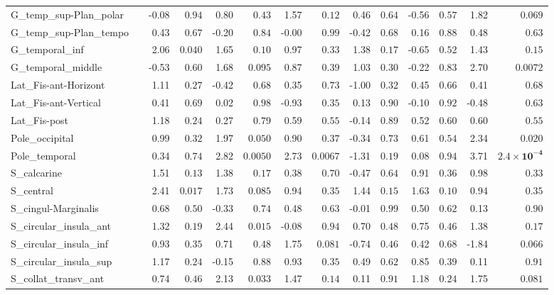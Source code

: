 {\begin{longtable}{llrrrrrrrrrrrr}
G\_temp\_sup-Plan\_polar &  & -0.08 & $0.94$ & 0.80 & $0.43$ & 1.57 & $0.12$ & 0.46 & $0.64$ & -0.56 & $0.57$ & 1.82 & $0.069$ \\
G\_temp\_sup-Plan\_tempo &  & 0.43 & $0.67$ & -0.20 & $0.84$ & -0.00 & $0.99$ & -0.42 & $0.68$ & 0.16 & $0.88$ & 0.48 & $0.63$ \\
G\_temporal\_inf &  & 2.06 & $0.040$ & 1.65 & $0.10$ & 0.97 & $0.33$ & 1.38 & $0.17$ & -0.65 & $0.52$ & 1.43 & $0.15$ \\
G\_temporal\_middle &  & -0.53 & $0.60$ & 1.68 & $0.095$ & 0.87 & $0.39$ & 1.03 & $0.30$ & -0.22 & $0.83$ & 2.70 & $0.0072$ \\
Lat\_Fis-ant-Horizont &  & 1.11 & $0.27$ & -0.42 & $0.68$ & 0.35 & $0.73$ & -1.00 & $0.32$ & 0.45 & $0.66$ & 0.41 & $0.68$ \\
Lat\_Fis-ant-Vertical &  & 0.41 & $0.69$ & 0.02 & $0.98$ & -0.93 & $0.35$ & 0.13 & $0.90$ & -0.10 & $0.92$ & -0.48 & $0.63$ \\
Lat\_Fis-post &  & 1.18 & $0.24$ & 0.27 & $0.79$ & 0.59 & $0.55$ & -0.14 & $0.89$ & 0.52 & $0.60$ & 0.60 & $0.55$ \\
Pole\_occipital &  & 0.99 & $0.32$ & 1.97 & $0.050$ & 0.90 & $0.37$ & -0.34 & $0.73$ & 0.61 & $0.54$ & 2.34 & $0.020$ \\
Pole\_temporal &  & 0.34 & $0.74$ & 2.82 & $0.0050$ & 2.73 & $0.0067$ & -1.31 & $0.19$ & 0.08 & $0.94$ & 3.71 & $\mathbf{2.4{\times}10^{-4}}$ \\
S\_calcarine &  & 1.51 & $0.13$ & 1.38 & $0.17$ & 0.38 & $0.70$ & -0.47 & $0.64$ & 0.91 & $0.36$ & 0.98 & $0.33$ \\
S\_central &  & 2.41 & $0.017$ & 1.73 & $0.085$ & 0.94 & $0.35$ & 1.44 & $0.15$ & 1.63 & $0.10$ & 0.94 & $0.35$ \\
S\_cingul-Marginalis &  & 0.68 & $0.50$ & -0.33 & $0.74$ & 0.48 & $0.63$ & -0.01 & $0.99$ & 0.50 & $0.62$ & 0.13 & $0.90$ \\
S\_circular\_insula\_ant &  & 1.32 & $0.19$ & 2.44 & $0.015$ & -0.08 & $0.94$ & 0.70 & $0.48$ & 0.75 & $0.46$ & 1.38 & $0.17$ \\
S\_circular\_insula\_inf &  & 0.93 & $0.35$ & 0.71 & $0.48$ & 1.75 & $0.081$ & -0.74 & $0.46$ & 0.42 & $0.68$ & -1.84 & $0.066$ \\
S\_circular\_insula\_sup &  & 1.17 & $0.24$ & -0.15 & $0.88$ & 0.93 & $0.35$ & 0.49 & $0.62$ & 0.85 & $0.39$ & 0.11 & $0.91$ \\
S\_collat\_transv\_ant &  & 0.74 & $0.46$ & 2.13 & $0.033$ & 1.47 & $0.14$ & 0.11 & $0.91$ & 1.18 & $0.24$ & 1.75 & $0.081$ \\

\end{longtable}}
